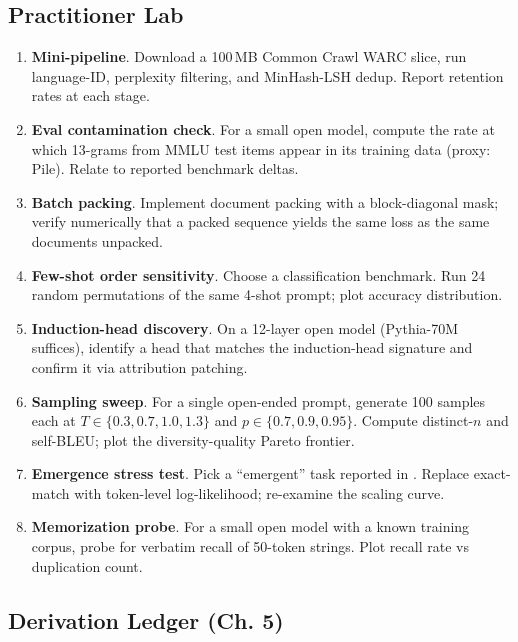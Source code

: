 \subsection{Practitioner Lab}

\begin{enumerate}
  \item \textbf{Mini-pipeline}. Download a 100\,MB Common Crawl WARC
        slice, run language-ID, perplexity filtering, and MinHash-LSH
        dedup. Report retention rates at each stage.
  \item \textbf{Eval contamination check}. For a small open model,
        compute the rate at which 13-grams from MMLU test items
        appear in its training data (proxy: Pile). Relate to
        reported benchmark deltas.
  \item \textbf{Batch packing}. Implement document packing with a
        block-diagonal mask; verify numerically that a packed
        sequence yields the same loss as the same documents unpacked.
  \item \textbf{Few-shot order sensitivity}. Choose a classification
        benchmark. Run 24 random permutations of the same 4-shot
        prompt; plot accuracy distribution.
  \item \textbf{Induction-head discovery}. On a 12-layer open model
        (Pythia-70M suffices), identify a head that matches the
        induction-head signature and confirm it via attribution
        patching.
  \item \textbf{Sampling sweep}. For a single open-ended prompt,
        generate 100 samples each at $T \in \{0.3, 0.7, 1.0, 1.3\}$
        and $p \in \{0.7, 0.9, 0.95\}$. Compute distinct-$n$ and
        self-BLEU; plot the diversity-quality Pareto frontier.
  \item \textbf{Emergence stress test}. Pick a ``emergent'' task
        reported in \citet{wei2022emergent}. Replace exact-match with
        token-level log-likelihood; re-examine the scaling curve.
  \item \textbf{Memorization probe}. For a small open model with a
        known training corpus, probe for verbatim recall of 50-token
        strings. Plot recall rate vs duplication count.
\end{enumerate}

\subsection*{Derivation Ledger (Ch. 5)}

